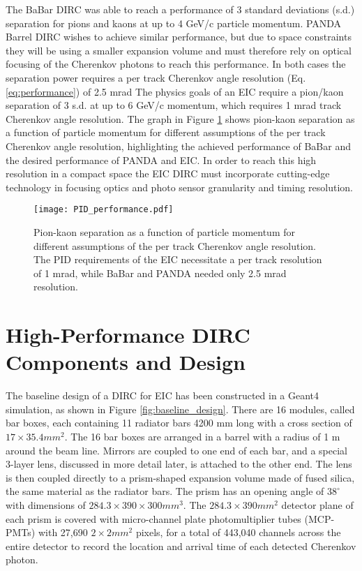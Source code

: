 \label{ch:eicdirc}
The BaBar DIRC was able to reach a performance of 3 standard deviations (s.d.) separation for pions and kaons at up to 4 GeV/c particle momentum. PANDA Barrel DIRC wishes to achieve similar performance, but due to space constraints they will be using a smaller expansion volume and must therefore rely on optical focusing of the Cherenkov photons to reach this performance. In both cases the separation power requires a per track Cherenkov angle resolution (Eq. \ref{eq:performance}) of 2.5 mrad The physics goals of an EIC require a pion/kaon separation of 3 s.d. at up to 6 GeV/c momentum, which requires 1 mrad track Cherenkov angle resolution. The graph in Figure \ref{fig:PID_performance} shows pion-kaon separation as a function of particle momentum for different assumptions of the per track Cherenkov angle resolution, highlighting the achieved performance of BaBar and the desired performance of PANDA and EIC. In order to reach this high resolution in a compact space the EIC DIRC must incorporate cutting-edge technology in focusing optics and photo sensor granularity and timing resolution.

\begin{figure}[ht]
	\centering
	\texttt{[image: PID\_performance.pdf]}
	\caption{Pion-kaon separation as a function of particle momentum for different assumptions of the per track Cherenkov angle resolution. The PID requirements of the EIC necessitate a per track resolution of 1 mrad, while BaBar and PANDA needed only 2.5 mrad resolution.}
	\label{fig:PID_performance}
\end{figure}

\section{High-Performance DIRC Components and Design}
The baseline design of a DIRC for EIC has been constructed in a Geant4 simulation, as shown in Figure \ref{fig:baseline_design}. There are 16 modules, called bar boxes, each containing 11 radiator bars 4200 mm long with a cross section of $17\times35.4\unit{mm}^2$. The 16 bar boxes are arranged in a barrel with a radius of 1 m around the beam line. Mirrors are coupled to one end of each bar, and a special 3-layer lens, discussed in more detail later, is attached to the other end. The lens is then coupled directly to a prism-shaped expansion volume made of fused silica, the same material as the radiator bars. The prism has an opening angle of $38^\circ$ with dimensions of $284.3\times390\times300\unit{mm}^3$. The $284.3\times390\unit{mm}^2$ detector plane of each prism is covered with micro-channel plate photomultiplier tubes (MCP-PMTs) with 27,690 $2\times2\unit{mm}^2$ pixels, for a total of 443,040 channels across the entire detector to record the location and arrival time of each detected Cherenkov photon.

